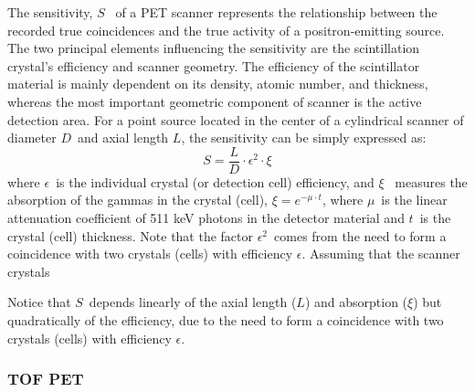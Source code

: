 The sensitivity, $S$~ of a PET scanner represents the relationship between the recorded true coincidences and the true activity of a positron-emitting source. The two principal elements influencing the sensitivity are the scintillation crystal’s efficiency and scanner geometry. The efficiency of the scintillator material is mainly dependent on its density, atomic number, and thickness, whereas the most important geometric component of scanner is the active detection area. For a point source located in the center of a cylindrical scanner of diameter $D$~and axial length $L$, the sensitivity 
can be simply expressed as:
%
\begin{equation}
S = \frac{L}{D} \cdot \epsilon^2 \cdot \xi
\label{eq.sensi}
\end{equation}
%
where $\epsilon$~is the individual crystal (or detection cell) efficiency, and $\xi$~ measures the absorption of the gammas in the crystal (cell), $\xi = e^{-\mu \cdot t}$, where $\mu$~is the linear attenuation coefficient of 511 keV photons in the detector material and $t$~is the crystal (cell) thickness. Note that the factor $\epsilon^2$~comes from the need to form a coincidence with two crystals (cells) with efficiency $\epsilon$. Assuming that the scanner crystals 

Notice that $S$~depends linearly of the axial length ($L$) and absorption ($\xi$) but quadratically of the efficiency, due to the need to form a coincidence with two crystals (cells) with efficiency $\epsilon$. 

\subsubsection*{TOF PET}

